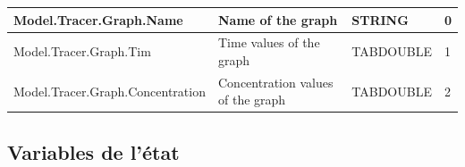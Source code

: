 \documentclass[a4paper,11pt]{article}
\begin{document}
\begin{landscape}
\begin{table}[ht]
\begin{center}
\begin{tabular}{|l|l|l|l|}
\hline Model.Tracer.Graph.Name & Name of the graph & STRING & 0 \\
\hline Model.Tracer.Graph.Tim & Time values of the graph & TABDOUBLE & 1 \\
\hline Model.Tracer.Graph.Concentration & Concentration values of the graph & TABDOUBLE & 2 \\
\hline 
\end{tabular} 
\end{center}
\end{table}





\end{landscape}

\subsection{Variables de l'\'etat}
\end{document}
